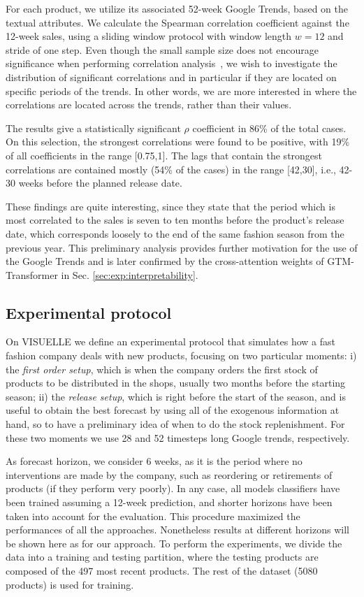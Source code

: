 \documentclass{article}
\newcommand{\datasetname}[0] {VISUELLE}
\newcommand{\approachname}[0] {GTM-Transformer\xspace}
\begin{document}
For each product, we utilize its associated 52-week Google Trends, based on the textual attributes. We calculate the Spearman correlation coefficient against the 12-week sales, using a sliding window protocol with window length $w=12$ and stride of one step. Even though the small sample size does not encourage significance when performing correlation analysis~\cite{de2016comparing}, we wish to investigate the distribution of significant correlations and in particular if they are located on specific periods of the trends. In other words, we are more interested in where the correlations are located across the trends, rather than their values. 

The results give a statistically significant $\rho$ coefficient in 86\% of the total cases. On this selection, the strongest correlations were found to be positive, with 19\% of all coefficients in the range [0.75,1]. The lags that contain the strongest correlations are contained mostly (54\% of the cases) in the range [42,30], i.e., 42-30 weeks before the planned release date.

These findings are quite interesting, since they state that the period which is most correlated to the sales is seven to ten months before the product's release date, which corresponds loosely to the end of the same fashion season from the previous year. This preliminary analysis provides further motivation for the use of the Google Trends and is later confirmed by the cross-attention weights of \approachname in Sec. \ref{sec:exp:interpretability}.



\subsection{Experimental protocol}\label{sec:exp:proto}
On \datasetname{} we define an experimental protocol that simulates how a fast fashion company deals with new products, focusing on two particular moments: i) the \emph{first order setup}, which is when the company orders the first stock of products to be distributed in the shops, usually two months before the starting season; ii) the \emph{release setup}, which is right before the start of the season, and is useful to obtain the best forecast by using all of the exogenous information at hand, so to have a preliminary idea of when to do the stock replenishment. For these two moments we use 28 and 52 timesteps long Google trends, respectively.

As forecast horizon, we consider 6  weeks, as it is the period where no interventions are made by the company, such as reordering or retirements of products (if they perform very poorly). In any case, all models classifiers have been trained assuming a 12-week prediction, and shorter horizons have been taken into account for the evaluation. This procedure maximized the performances of all the approaches. Nonetheless results at different horizons will be shown here as for our approach. To perform the experiments, we divide the data into a training and testing partition, where the testing products are composed of the 497 most recent products. The rest of the dataset (5080 products) is used for training. 
\end{document}
